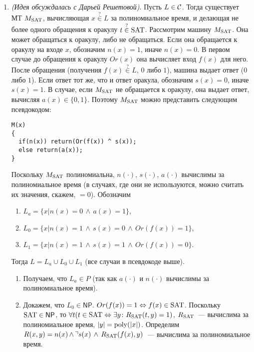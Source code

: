 \documentclass[a4paper]{article}
\def\C{{\cal C}}
\def\NP{{\mathsf{NP}}}
\def\SAT{{\rm{SAT}}}
\def\poly{{\rm{poly}}}
\begin{document}
\begin{enumerate}
\begin{enumerate}
\end{enumerate}
\item {\em (Идея обсуждалась с Дарьей Решетовой)}. Пусть $L\in \C$. Тогда существует МТ $M_\SAT$, вычисляющая $x\overset{?}{\in}L$ за полиномиальное время, и делающая не более одного обращения к оракулу $t\overset{?}{\in}\SAT$. Рассмотрим машину $M_\SAT$. Она может обращаться к оракулу, либо не обращаться. Если она обращается к оракулу на входе $x$, обозначим $n(x)=1$, иначе $n(x)=0$. В первом случае до обращения к оракулу $Or(x)$ она вычисляет вход $f(x)$ для него. После обращения (получения $f(x)\overset{?}{\in}L$, $0$ либо $1$), машина выдает ответ ($0$ либо $1$). Если ответ тот же, что и ответ оракула, обозначим $s(x)=0$, иначе $s(x)=1$. В случае, если $M_\SAT$ не обращается к оракулу, она выдает ответ, вычисляя $a(x)\in\{0, 1\}$. Поэтому $M_\SAT$ можно представить следующим псевдокодом:
\begin{lstlisting}
M(x)
{
  if(n(x)) return(Or(f(x)) ^ s(x));
  else return(a(x));
}
\end{lstlisting}
Поскольку $M_\SAT$ полиномиальна, $n(\cdot)$, $s(\cdot)$, $a(\cdot)$ вычислимы за полиномиальное время (в случаях, где они не используются, можно считать их значения, скажем, $=0$).\newline
Обозначим \begin{enumerate}
\item  $L_a=\{x\big| n(x)=0\,\wedge\, a(x)=1\}$,
\item $L_0=\{x\big| n(x)=1\,\wedge\, s(x)=0\,\wedge\, Or(f(x))=1\}$,
\item $L_1=\{x\big| n(x)=1\,\wedge\, s(x)=1\,\wedge\, Or(f(x))=0\}$.
\end{enumerate}
Тогда $L=L_a\cup L_0\cup L_1$ (все случаи в псевдокоде выше).\begin{enumerate}
\item Получаем, что $L_a\in P$ (так как $a(\cdot)$ и $n(\cdot)$ вычислимы за полиномиальное время).
\item Докажем, что $L_0\in \NP$. $Or(f(x))=1\Leftrightarrow f(x)\in \SAT$. Поскольку $\SAT\in\NP$, то $\forall t(t\in\SAT\Leftrightarrow\exists y\colon R_\SAT(t,y)=1)$, $R_\SAT$~--- вычислима за полиномиальное время, $|y|=\poly(|x|)$. Определим $R(x,y)=n(x)\,\wedge\,\urcorner s(x)\,\wedge\, R_\SAT(f(x),y)$~--- вычислима за полиномиальное время.\begin{enumerate}

\end{enumerate}
\end{enumerate}
\end{enumerate}
\end{document}

